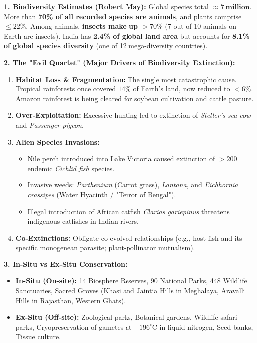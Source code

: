 \documentclass[10pt,a4paper]{article}
\begin{document}
\begin{ncertbox}
\textbf{1. Biodiversity Estimates (Robert May):}
Global species total $\approx \mathbf{7\,\text{million}}$. More than \textbf{70\% of all recorded species are animals}, and plants comprise $\le 22\%$. Among animals, \textbf{insects make up $>70\%$} (7 out of 10 animals on Earth are insects). India has \textbf{2.4\% of global land area} but accounts for \textbf{8.1\% of global species diversity} (one of 12 mega-diversity countries).

\textbf{2. The "Evil Quartet" (Major Drivers of Biodiversity Extinction):}
\begin{enumerate}
  \item \textbf{Habitat Loss \& Fragmentation:} The single most catastrophic cause. Tropical rainforests once covered $14\%$ of Earth's land, now reduced to $<6\%$. Amazon rainforest is being cleared for soybean cultivation and cattle pasture.
  \item \textbf{Over-Exploitation:} Excessive hunting led to extinction of \textit{Steller's sea cow} and \textit{Passenger pigeon}.
  \item \textbf{Alien Species Invasions:}
  \begin{itemize}
    \item Nile perch introduced into Lake Victoria caused extinction of $>200$ endemic \textit{Cichlid fish} species.
    \item Invasive weeds: \textit{Parthenium} (Carrot grass), \textit{Lantana}, and \textit{Eichhornia crassipes} (Water Hyacinth / "Terror of Bengal").
    \item Illegal introduction of African catfish \textit{Clarias gariepinus} threatens indigenous catfishes in Indian rivers.
  \end{itemize}
  \item \textbf{Co-Extinctions:} Obligate co-evolved relationships (e.g., host fish and its specific monogenean parasite; plant-pollinator mutualism).
\end{enumerate}
\textbf{3. In-Situ vs Ex-Situ Conservation:}
\begin{itemize}
  \item \textbf{In-Situ (On-site):} 14 Biosphere Reserves, 90 National Parks, 448 Wildlife Sanctuaries, Sacred Groves (Khasi and Jaintia Hills in Meghalaya, Aravalli Hills in Rajasthan, Western Ghats).
  \item \textbf{Ex-Situ (Off-site):} Zoological parks, Botanical gardens, Wildlife safari parks, Cryopreservation of gametes at $-196^\circ\mathrm{C}$ in liquid nitrogen, Seed banks, Tissue culture.
\end{itemize}
\end{ncertbox}
\end{document}
